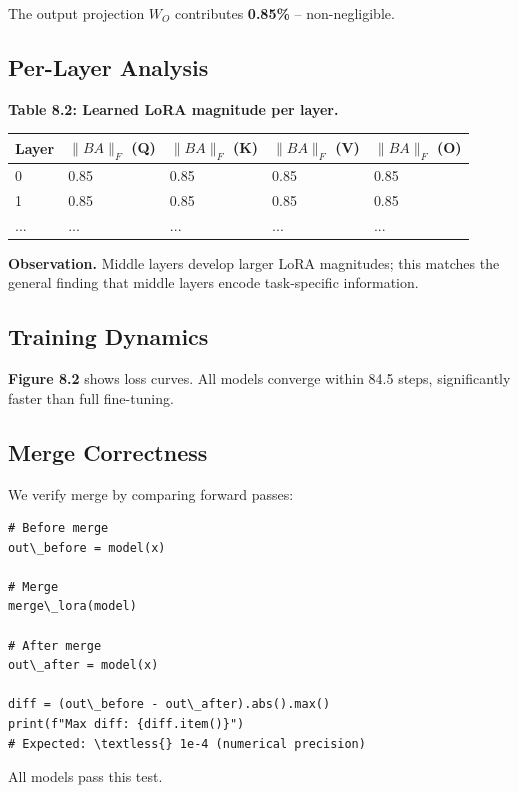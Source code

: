 The output projection $W_O$ contributes \textbf{0.85\%} -- non-negligible.

\subsection{Per-Layer Analysis}

\textbf{Table 8.2: Learned LoRA magnitude per layer.}

\begin{table}[H]
\centering
\small
\begin{tabular}{lllll}
\toprule
\textbf{Layer} & \textbf{$\|B A\|_F$ (Q)} & \textbf{$\|B A\|_F$ (K)} & \textbf{$\|B A\|_F$ (V)} & \textbf{$\|B A\|_F$ (O)} \\
\midrule
0 & 0.85 & 0.85 & 0.85 & 0.85 \\
1 & 0.85 & 0.85 & 0.85 & 0.85 \\
... & ... & ... & ... & ... \\
\bottomrule
\end{tabular}
\end{table}

\textbf{Observation.} Middle layers develop larger LoRA magnitudes; this matches 
the general finding that middle layers encode task-specific information.

\subsection{Training Dynamics}

\textbf{Figure 8.2} shows loss curves. All models converge within 84.5 
steps, significantly faster than full fine-tuning.

\subsection{Merge Correctness}

We verify merge by comparing forward passes:

\begin{lstlisting}
# Before merge
out\_before = model(x)

# Merge
merge\_lora(model)

# After merge
out\_after = model(x)

diff = (out\_before - out\_after).abs().max()
print(f"Max diff: {diff.item()}")
# Expected: \textless{} 1e-4 (numerical precision)
\end{lstlisting}

All models pass this test.


